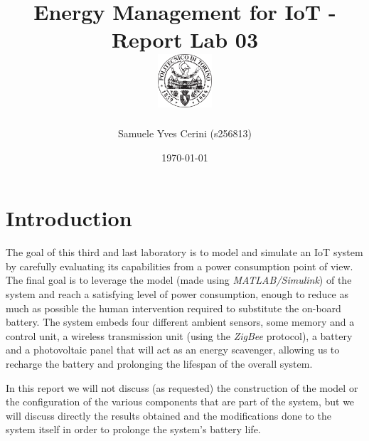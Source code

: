 \documentclass[a4paper]{article}
\begin{document}
    \title{
        Energy Management for IoT - Report Lab 03 \\[0.5cm]
        \includegraphics[width=0.15\textwidth]{PoliLogo.png}%
    }
    \author{Samuele Yves Cerini (s256813)}
    \date{\today}
    \maketitle

    \tableofcontents

%
\section{Introduction}
    The goal of this third and last laboratory is to model and simulate an IoT system by carefully evaluating its capabilities from a power consumption point of view. The final goal is to leverage the model (made using \emph{MATLAB/Simulink}) of the system and reach a satisfying level of power consumption, enough to reduce as much as possible the human intervention required to substitute the on-board battery. The system embeds four different ambient sensors, some memory and a control unit, a wireless transmission unit (using the \emph{ZigBee} protocol), a battery and a photovoltaic panel that will act as an energy scavenger, allowing us to recharge the battery and prolonging the lifespan of the overall system.
    
    In this report we will not discuss (as requested) the construction of the model or the configuration of the various components that are part of the system, but we will discuss directly the results obtained and the modifications done to the system itself in order to prolonge the system's battery life.
\end{document}
